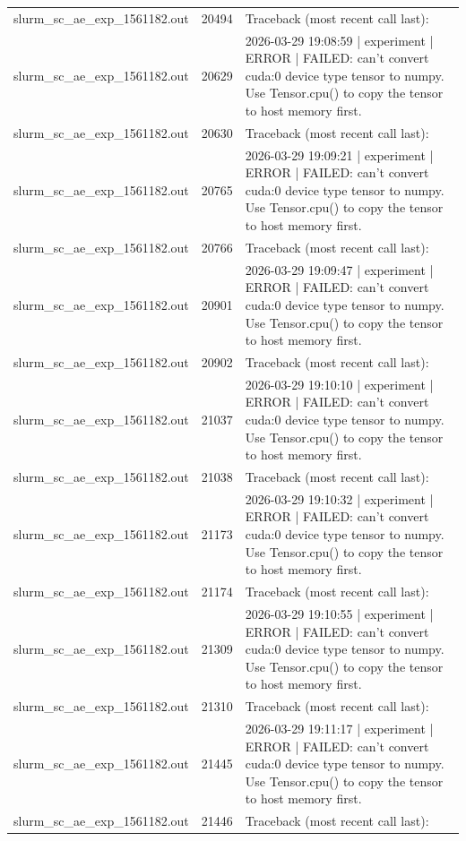 \begin{tabular}{lrl}
slurm\_sc\_ae\_exp\_1561182.out & 20494 & Traceback (most recent call last): \\
slurm\_sc\_ae\_exp\_1561182.out & 20629 & 2026-03-29 19:08:59 | experiment | ERROR |   FAILED: can't convert cuda:0 device type tensor to numpy. Use Tensor.cpu() to copy the tensor to host memory first. \\
slurm\_sc\_ae\_exp\_1561182.out & 20630 & Traceback (most recent call last): \\
slurm\_sc\_ae\_exp\_1561182.out & 20765 & 2026-03-29 19:09:21 | experiment | ERROR |   FAILED: can't convert cuda:0 device type tensor to numpy. Use Tensor.cpu() to copy the tensor to host memory first. \\
slurm\_sc\_ae\_exp\_1561182.out & 20766 & Traceback (most recent call last): \\
slurm\_sc\_ae\_exp\_1561182.out & 20901 & 2026-03-29 19:09:47 | experiment | ERROR |   FAILED: can't convert cuda:0 device type tensor to numpy. Use Tensor.cpu() to copy the tensor to host memory first. \\
slurm\_sc\_ae\_exp\_1561182.out & 20902 & Traceback (most recent call last): \\
slurm\_sc\_ae\_exp\_1561182.out & 21037 & 2026-03-29 19:10:10 | experiment | ERROR |   FAILED: can't convert cuda:0 device type tensor to numpy. Use Tensor.cpu() to copy the tensor to host memory first. \\
slurm\_sc\_ae\_exp\_1561182.out & 21038 & Traceback (most recent call last): \\
slurm\_sc\_ae\_exp\_1561182.out & 21173 & 2026-03-29 19:10:32 | experiment | ERROR |   FAILED: can't convert cuda:0 device type tensor to numpy. Use Tensor.cpu() to copy the tensor to host memory first. \\
slurm\_sc\_ae\_exp\_1561182.out & 21174 & Traceback (most recent call last): \\
slurm\_sc\_ae\_exp\_1561182.out & 21309 & 2026-03-29 19:10:55 | experiment | ERROR |   FAILED: can't convert cuda:0 device type tensor to numpy. Use Tensor.cpu() to copy the tensor to host memory first. \\
slurm\_sc\_ae\_exp\_1561182.out & 21310 & Traceback (most recent call last): \\
slurm\_sc\_ae\_exp\_1561182.out & 21445 & 2026-03-29 19:11:17 | experiment | ERROR |   FAILED: can't convert cuda:0 device type tensor to numpy. Use Tensor.cpu() to copy the tensor to host memory first. \\
slurm\_sc\_ae\_exp\_1561182.out & 21446 & Traceback (most recent call last): \\

\end{tabular}
